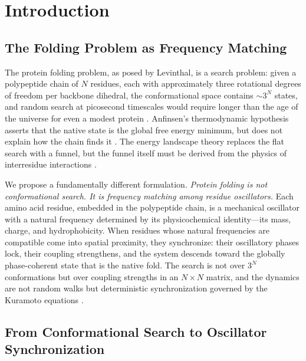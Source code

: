 \documentclass[11pt,twocolumn,a4paper]{article}
\theoremstyle{definition}
\theoremstyle{remark}
\begin{document}
\section{Introduction}
\label{sec:introduction}

\subsection{The Folding Problem as Frequency Matching}

The protein folding problem, as posed by Levinthal, is a search problem: given a polypeptide chain of $N$ residues, each with approximately three rotational degrees of freedom per backbone dihedral, the conformational space contains $\sim 3^N$ states, and random search at picosecond timescales would require longer than the age of the universe for even a modest protein \citep{levinthal1968}. Anfinsen's thermodynamic hypothesis asserts that the native state is the global free energy minimum, but does not explain how the chain finds it \citep{anfinsen1973}. The energy landscape theory replaces the flat search with a funnel, but the funnel itself must be derived from the physics of interresidue interactions \citep{wolynes2015, bryngelson1995, onuchic1997}.

We propose a fundamentally different formulation. \emph{Protein folding is not conformational search. It is frequency matching among residue oscillators.} Each amino acid residue, embedded in the polypeptide chain, is a mechanical oscillator with a natural frequency determined by its physicochemical identity---its mass, charge, and hydrophobicity. When residues whose natural frequencies are compatible come into spatial proximity, they synchronize: their oscillatory phases lock, their coupling strengthens, and the system descends toward the globally phase-coherent state that is the native fold. The search is not over $3^N$ conformations but over coupling strengths in an $N \times N$ matrix, and the dynamics are not random walks but deterministic synchronization governed by the Kuramoto equations \citep{kuramoto1975, kuramoto1984}.

\subsection{From Conformational Search to Oscillator Synchronization}
\end{document}
